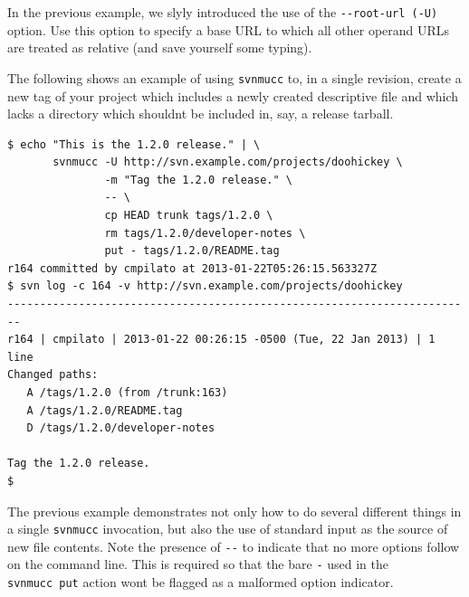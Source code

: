 In the previous example, we slyly introduced the use of the
\texttt{-\/-root-url\ (-U)} option. Use this option to specify a base
URL to which all other operand URLs are treated as relative (and save
yourself some typing).

The following shows an example of using \texttt{svnmucc} to, in a single
revision, create a new tag of your project which includes a newly
created descriptive file and which lacks a directory which
shouldn\textquotesingle t be included in, say, a release tarball.

\begin{verbatim}
$ echo "This is the 1.2.0 release." | \
       svnmucc -U http://svn.example.com/projects/doohickey \
               -m "Tag the 1.2.0 release." \
               -- \
               cp HEAD trunk tags/1.2.0 \
               rm tags/1.2.0/developer-notes \
               put - tags/1.2.0/README.tag
r164 committed by cmpilato at 2013-01-22T05:26:15.563327Z
$ svn log -c 164 -v http://svn.example.com/projects/doohickey
------------------------------------------------------------------------
r164 | cmpilato | 2013-01-22 00:26:15 -0500 (Tue, 22 Jan 2013) | 1 line
Changed paths:
   A /tags/1.2.0 (from /trunk:163)
   A /tags/1.2.0/README.tag
   D /tags/1.2.0/developer-notes

Tag the 1.2.0 release.
$ 
\end{verbatim}

The previous example demonstrates not only how to do several different
things in a single \texttt{svnmucc} invocation, but also the use of
standard input as the source of new file contents. Note the presence of
\texttt{-\/-} to indicate that no more options follow on the command
line. This is required so that the bare \texttt{-} used in the
\texttt{svnmucc\ put} action won\textquotesingle t be flagged as a
malformed option indicator.

